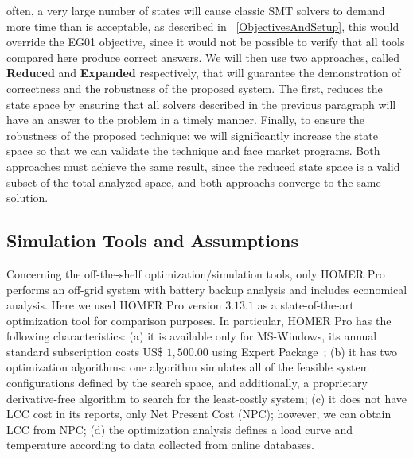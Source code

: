 \documentclass[10pt,journal,compsoc]{IEEEtran}
\begin{document}
often, a very large number of states will cause classic SMT solvers to demand more time than is acceptable, as described in ~\ref{ObjectivesAndSetup}, this would override the EG01 objective, since it would not be possible to verify that all tools compared here produce correct answers. We will then use two approaches, called \textbf{Reduced} and \textbf{Expanded} respectively, that will guarantee the demonstration of correctness and the robustness of the proposed system. The first, reduces the state space by ensuring that all solvers described in the previous paragraph will have an answer to the problem in a timely manner. Finally, to ensure the robustness of the proposed technique: we will significantly increase the state space so that we can validate the technique and face market programs. Both approaches must achieve the same result, since the reduced state space is a valid subset of the total analyzed space, and both approachs converge to the same solution.\color{black}


\subsection{Simulation Tools and Assumptions}
\label{sec:SimulationToolsandAssumptions}
Concerning the off-the-shelf optimization/simulation tools, only HOMER Pro performs an off-grid system with battery backup analysis and includes economical analysis. Here we used HOMER Pro version $3.13.1$ as a state-of-the-art optimization tool for comparison purposes. In particular, HOMER Pro has the following characteristics:
  (a) it is available only for MS-Windows, its annual standard subscription costs US\$ $1,500.00$ using Expert Package~\cite{HOMER}; \color{black}
(b) it has two optimization algorithms: one algorithm simulates all of the feasible system configurations defined by the search space, and additionally, a proprietary derivative-free algorithm to search for the least-costly system;
(c) it does not have LCC cost in its reports, only Net Present Cost (NPC); however, we can obtain LCC from NPC; 
(d) the optimization analysis defines a load curve and temperature according to data collected from online databases. 
\end{document}
